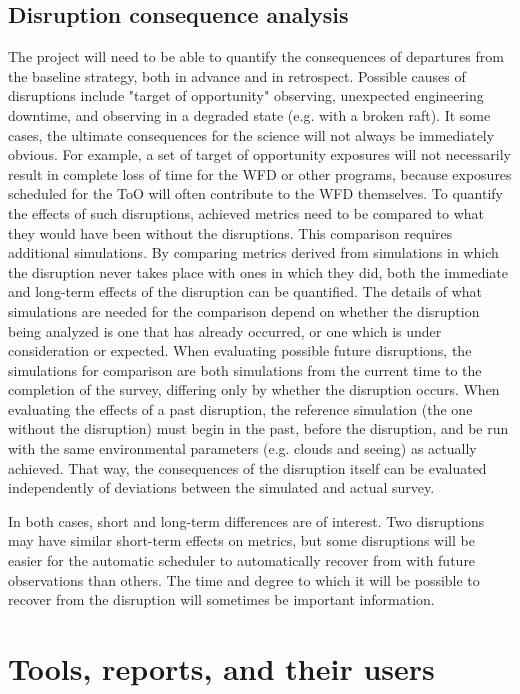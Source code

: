 \subsection{Disruption consequence analysis}
\label{sec:org53a7f74}
The project will need to be able to quantify the consequences of departures from the baseline strategy, both in advance and in retrospect. 
Possible causes of disruptions include "target of opportunity" observing, unexpected engineering downtime, and observing in a degraded state (e.g. with a broken raft). 
It some cases, the ultimate consequences for the science will not always be immediately obvious.
For example, a set of target of opportunity exposures will not necessarily result in complete loss of time for the WFD or other programs, because exposures scheduled for the ToO will often contribute to the WFD themselves. 
To quantify the effects of such disruptions, achieved metrics need to be compared to what they would have been without the disruptions.
This comparison requires additional simulations.
By comparing metrics derived from simulations in which the disruption never takes place with ones in which they did, both the immediate and long-term effects of the disruption can be quantified.
The details of what simulations are needed for the comparison depend on whether the disruption being analyzed is one that has already occurred, or one which is under consideration or expected.
When evaluating possible future disruptions, the simulations for comparison are both simulations from the current time to the completion of the survey, differing only by whether the disruption occurs.
When evaluating the effects of a past disruption, the reference simulation (the one without the disruption) must begin in the past, before the disruption, and be run with the same environmental parameters (e.g. clouds and seeing) as actually achieved.
That way, the consequences of the disruption itself can be evaluated independently of deviations between the simulated and actual survey.

In both cases, short and long-term differences are of interest.
Two disruptions may have similar short-term effects on metrics, but some disruptions will be easier for the automatic scheduler to automatically recover from with future observations than others.
The time and degree to which it will be possible to recover from the disruption will sometimes be important information.

\section{Tools, reports, and their users}
\label{sec:org389edf0}
